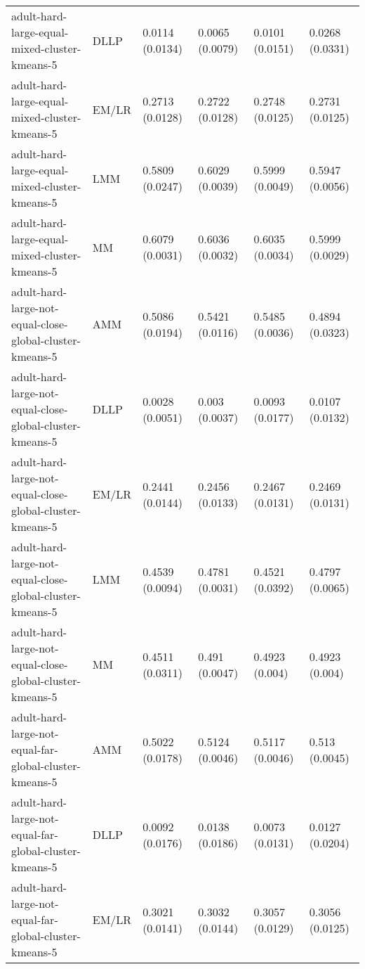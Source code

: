 \begin{tabular}{llllll}
                                          adult-hard-large-equal-mixed-cluster-kmeans-5 &      DLLP & 0.0114 (0.0134) &  0.0065 (0.0079) &   0.0101 (0.0151) &     0.0268 (0.0331) \\
                                          adult-hard-large-equal-mixed-cluster-kmeans-5 &     EM/LR & 0.2713 (0.0128) &  0.2722 (0.0128) &   0.2748 (0.0125) &     0.2731 (0.0125) \\
                                          adult-hard-large-equal-mixed-cluster-kmeans-5 &       LMM & 0.5809 (0.0247) &  0.6029 (0.0039) &   0.5999 (0.0049) &     0.5947 (0.0056) \\
                                          adult-hard-large-equal-mixed-cluster-kmeans-5 &        MM & 0.6079 (0.0031) &  0.6036 (0.0032) &   0.6035 (0.0034) &     0.5999 (0.0029) \\
                               adult-hard-large-not-equal-close-global-cluster-kmeans-5 &       AMM & 0.5086 (0.0194) &  0.5421 (0.0116) &   0.5485 (0.0036) &     0.4894 (0.0323) \\
                               adult-hard-large-not-equal-close-global-cluster-kmeans-5 &      DLLP & 0.0028 (0.0051) &   0.003 (0.0037) &   0.0093 (0.0177) &     0.0107 (0.0132) \\
                               adult-hard-large-not-equal-close-global-cluster-kmeans-5 &     EM/LR & 0.2441 (0.0144) &  0.2456 (0.0133) &   0.2467 (0.0131) &     0.2469 (0.0131) \\
                               adult-hard-large-not-equal-close-global-cluster-kmeans-5 &       LMM & 0.4539 (0.0094) &  0.4781 (0.0031) &   0.4521 (0.0392) &     0.4797 (0.0065) \\
                               adult-hard-large-not-equal-close-global-cluster-kmeans-5 &        MM & 0.4511 (0.0311) &   0.491 (0.0047) &    0.4923 (0.004) &      0.4923 (0.004) \\
                                 adult-hard-large-not-equal-far-global-cluster-kmeans-5 &       AMM & 0.5022 (0.0178) &  0.5124 (0.0046) &   0.5117 (0.0046) &      0.513 (0.0045) \\
                                 adult-hard-large-not-equal-far-global-cluster-kmeans-5 &      DLLP & 0.0092 (0.0176) &  0.0138 (0.0186) &   0.0073 (0.0131) &     0.0127 (0.0204) \\
                                 adult-hard-large-not-equal-far-global-cluster-kmeans-5 &     EM/LR & 0.3021 (0.0141) &  0.3032 (0.0144) &   0.3057 (0.0129) &     0.3056 (0.0125) \\

\end{tabular}
